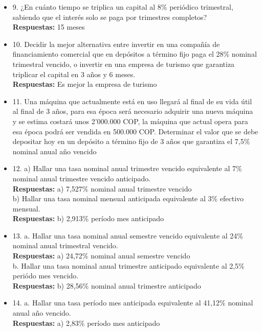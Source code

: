 \begin{itemize}
 \item 9. ¿En cuánto tiempo se triplica un capital al 8\% periódico trimestral, sabiendo que el interés solo se paga por trimestres completos?\\
       \textbf{Respuestas:} 15 meses
       \medskip

 \item 10. Decidir la mejor alternativa entre invertir en una compañía de financiamiento comercial que en depósitos a término fijo paga el 28\% nominal trimestral vencido, o invertir en una empresa de turismo que garantiza triplicar el capital en 3 años y 6 meses.\\
       \textbf{Respuestas:} Es mejor la empresa de turismo
       \medskip

 \item 11. Una máquina que actualmente está en uso llegará al final de su vida útil  al final de 3 años, para esa época será necesario adquirir una nueva máquina y se estima costará unos 2'000.000 COP, la máquina que actual opera para esa época podrá ser vendida en 500.000 COP. Determinar el  valor que se debe depositar hoy en un depósito a término fijo de 3 años que garantiza el 7,5\% nominal anual año vencido  \\
       \medskip

 \item 12. a) Hallar una tasa nominal anual trimestre vencido equivalente al 7\% nominal anual trimestre vencido anticipado.\\
       \textbf{Respuestas:} a) 7,527\% nominal anual trimestre vencido \\

       b) Hallar una tasa nominal mensual anticipada equivalente al 3\% efectivo mensual. \\
       \textbf{Respuestas:} b) 2,913\% período mes anticipado
       \medskip

 \item 13. a. Hallar una tasa nominal anual semestre vencido equivalente al 24\% nominal anual trimestral vencido.\\
       \textbf{Respuestas:} a) 24,72\% nominal anual semestre vencido\\

       b. Hallar una tasa nominal anual trimestre anticipado equivalente al 2,5\% periódo mes vencido.\\
       \textbf{Respuestas:} b) 28,56\% nominal anual trimestre anticipado
       \medskip

 \item 14.  a. Hallar una tasa período mes anticipada equivalente al 41,12\% nominal anual año vencido.\\
       \textbf{Respuestas:} a) 2,83\% período mes anticipado  \\


\end{itemize}
